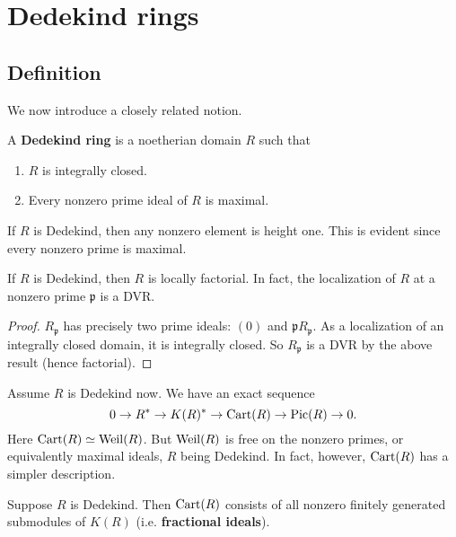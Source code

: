 \section{Dedekind rings}

\subsection{Definition}
We now introduce a closely related notion.  
\begin{definition} 
A \textbf{Dedekind ring} is a noetherian domain $R$ such that 
\begin{enumerate}
\item $R$ is integrally closed.
\item Every nonzero prime ideal of $R$ is maximal. 
\end{enumerate}
\end{definition} 


\begin{remark} 
If $R$ is Dedekind, then any nonzero element is height one. This is evident
since every nonzero prime is maximal. 

If $R$ is Dedekind, then $R$ is locally factorial. In fact, the localization of
$R$ at a nonzero prime $\mathfrak{p}$ is a DVR.
\begin{proof} 
$R_{\mathfrak{p}}$ has precisely two prime ideals: $(0)$ and
$\mathfrak{p}R_{\mathfrak{p}}$. As a localization of an integrally closed
domain, it is integrally closed. So $R_{\mathfrak{p}}$ is a DVR by the above
result (hence
factorial).
\end{proof} 
\end{remark} 


Assume $R$ is Dedekind now.
We have an exact sequence
\[ 0 \to R^* \to K(R)^* \to \operatorname{Cart}(R) \to \operatorname{Pic}(R) \to 0.  \]
Here $\operatorname{Cart}(R) \simeq \operatorname{Weil}(R)$. But $\operatorname{Weil}(R)$ is free on the nonzero
primes, or equivalently maximal ideals, $R$ being Dedekind. 
In fact, however, $\operatorname{Cart}(R)$ has a simpler description.

\begin{proposition} 
Suppose $R$ is Dedekind. Then $\operatorname{Cart}(R)$ consists of all nonzero finitely generated
submodules of $K(R)$ (i.e. \textbf{fractional ideals}). 
\end{proposition} 

